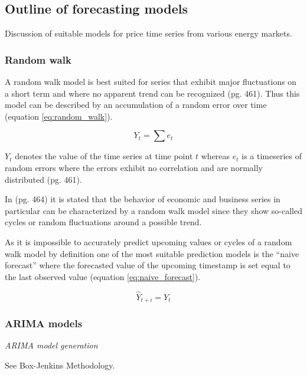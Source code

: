 \subsection{Outline of forecasting models}

Discussion of suitable models for price time series from various energy markets. 


\subsubsection{Random walk}

A random walk model is best suited for series that exhibit major fluctuations on a short term and where no apparent trend can be recognized \cite{makridakisforecasting}(pg. 461). Thus this model can be described by an accumulation of a random error over time (equation \ref{eq:random_walk}). 

\begin{equation}
Y_t = \sum e_t
\label{eq:random_walk}
\end{equation}

$Y_t$ denotes the value of the time series at time point $t$ whereas $e_t$ is a timeseries of random errors where the errors exhibit no correlation and are normally distributed \cite{makridakisforecasting}(pg. 461). 

In \cite{makridakisforecasting}(pg. 464) it is stated that the behavior of economic and business series in particular can be characterized by a random walk model since they show so-called cycles or random fluctuations around a possible trend. 

As it is impossible to accurately predict upcoming values or cycles of a random walk model by definition one of the most suitable prediction models is the ``naive forecast'' where the forecasted value of the upcoming timestamp is set equal to the last observed value (equation \ref{eq:naive_forecast}).

\begin{equation}
\hat{Y}_{t+i} = Y_t
\label{eq:naive_forecast}
\end{equation}



\subsubsection{ARIMA models}

\emph{ARIMA model generation}

See Box-Jenkins Methodology. 


